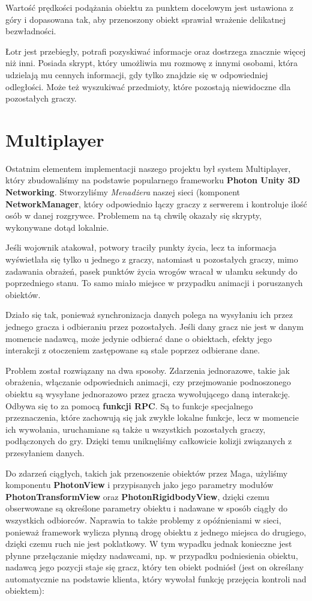 \documentclass[openright]{xmgr}
\newcommand{\name}[1]{\textbf{\textcolor{NavyBlue}{#1}}}
\begin{document}
    Wartość prędkości podążania obiektu za punktem docelowym jest ustawiona z góry i dopasowana tak, aby przenoszony obiekt sprawiał wrażenie delikatnej bezwładności.


    Łotr jest przebiegły, potrafi pozyskiwać informacje oraz dostrzega znacznie więcej niż inni. Posiada skrypt, który umożliwia mu rozmowę z innymi osobami, która udzielają mu cennych informacji, gdy tylko znajdzie się w odpowiedniej odległości. Może też wyszukiwać przedmioty, które pozostają niewidoczne dla pozostałych graczy.

  \section{Multiplayer}

      Ostatnim elementem implementacji naszego projektu był system Multiplayer, który zbudowaliśmy na podstawie popularnego frameworku \name{Photon Unity 3D Networking}. Stworzyliśmy \textit{Menadżera} naszej sieci (komponent \name{NetworkManager}, który odpowiednio łączy graczy z serwerem i kontroluje ilość osób w danej rozgrywce. Problemem na tą chwilę okazały się skrypty, wykonywane dotąd lokalnie.

      Jeśli wojownik atakował, potwory traciły punkty życia, lecz ta informacja wyświetlała się tylko u jednego z graczy, natomiast u pozostałych graczy, mimo zadawania obrażeń, pasek punktów życia wrogów wracał w ułamku sekundy do poprzedniego stanu. To samo miało miejsce w przypadku animacji i poruszanych obiektów.

      Działo się tak, ponieważ synchronizacja danych polega na wysyłaniu ich przez jednego gracza i odbieraniu przez pozostałych. Jeśli dany gracz nie jest w danym momencie nadawcą, może jedynie odbierać dane o obiektach, efekty jego interakcji z otoczeniem zastępowane są stale poprzez odbierane dane.

      Problem został rozwiązany na dwa sposoby. Zdarzenia jednorazowe, takie jak obrażenia, włączanie odpowiednich animacji, czy przejmowanie podnoszonego obiektu są wysyłane jednorazowo przez gracza wywołującego daną interakcję. Odbywa się to za pomocą \name{funkcji RPC}. Są to funkcje specjalnego przeznaczenia, które zachowują się jak zwykłe lokalne funkcje, lecz w momencie ich wywołania, uruchamiane są także u wszystkich pozostałych graczy, podłączonych do gry. Dzięki temu uniknęliśmy całkowicie kolizji związanych z przesyłaniem danych.

      Do zdarzeń ciągłych, takich jak przenoszenie obiektów przez Maga, użyliśmy komponentu \name{PhotonView} i przypisanych jako jego parametry modułów \name{PhotonTransformView} oraz \name{PhotonRigidbodyView}, dzięki czemu obserwowane są określone parametry obiektu i nadawane w sposób ciągły do wszystkich odbiorców. Naprawia to także problemy z opóźnieniami w sieci, ponieważ framework wylicza płynną drogę obiektu z jednego miejsca do drugiego, dzięki czemu ruch nie jest poklatkowy. W tym wypadku jednak konieczne jest płynne przełączanie między nadawcami, np. w przypadku podniesienia obiektu, nadawcą jego pozycji staje się gracz, który ten obiekt podniósł (jest on określany automatycznie na podstawie klienta, który wywołał funkcję przejęcia kontroli nad obiektem):
\end{document}
